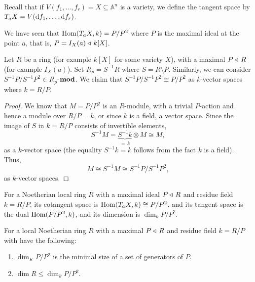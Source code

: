 \documentclass[11pt,a4paper]{article}
\newcommand{\A}{\mathbb A}
\begin{document}

\begin{remark}
  Recall that if $V(f_1,\dots,f_r) = X \subseteq \A^n$ is a variety,
  we define the tangent space by $T_a X = V(\mathrm{d} f_1,\dots, \mathrm{d} f_r)$.

  We have seen that $\operatorname{Hom}(T_a X,k) = P/P^2$ where $P$ is the maximal ideal
  at the point $a$, that is, $P = I_X(a) \triangleleft\, k[X]$.
\end{remark}

\begin{proposition}
  Let $R$ be a ring (for example $k[X]$ for some variety $X$),
  with a maximal $P \triangleleft\, R$ (for example $I_X(a)$).
  Set $R_p = S^{-1} R$ where $S = R \setminus P$.
  Similarly, we can consider $S^{-1} P / S^{-1} P^2 \in R_p$-$\mathbf{mod}$.
  We claim that $S^{-1} P / S^{-1} P^2 \cong P/P^2$ as $k$-vector spaces
  where $k = R/P$.
\end{proposition}
\begin{proof}
  We know that $M = P/P^2$ is an $R$-module,
  with a trivial $P$-action and hence a module over $R/P = k$,
  or since $k$ is a field, a vector space.
  Since the image of $S$ in $k = R/P$ consists of invertible elements,
  \[
    S^{-1} M =
    \underbrace{S^{-1} k}_{=\,k} \otimes M \cong M,
  \]
  as a $k$-vector space (the equality $S^{-1} k = k$ follows from 
  the fact $k$ is a field).
  Thus,
  \[
    M \cong S^{-1} M \cong S^{-1} P / S^{-1} P^2,
  \]
  as $k$-vector spaces.
\end{proof}

\begin{definition}
  For a Noetherian
  local ring $R$ with a maximal ideal $P \triangleleft\, R$ and residue field
  $k = R/P$, its cotangent space is $\operatorname{Hom}(T_a X,k) \cong P/P^2$,
  and its tangent space is the dual $\operatorname{Hom}(P/P^2,k)$,
  and its dimension is $\dim_k P/P^2$.
\end{definition}

\begin{proposition}
  \label{prop:we-need-nakayama}
  For a local Noetherian ring $R$ with a maximal $P \triangleleft\, R$ 
  and residue field $k = R/P$ with have the following:
  \begin{enumerate}
  \item[(1)] $\dim_K P/P^2$ is the minimal size of a set of generators of $P$.
  \item[(2)] $\dim R \le \dim_k P/P^2$.
  \end{enumerate}
\end{proposition}
\end{document}
